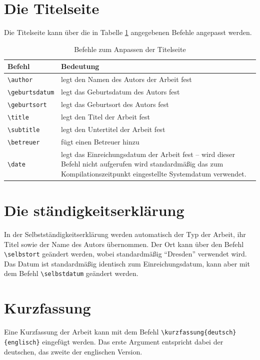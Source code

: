 \section{Die Titelseite}
Die Titelseite kann über die in Tabelle \ref{tab:titel} angegebenen Befehle angepasst werden.
\begin{table}[htbp]
\caption{Befehle zum Anpassen der Titelseite}
\label{tab:titel}
\begin{tabular}{lp{12cm}}
Befehl & Bedeutung\\
\toprule
\verb|\author| & legt den Namen des Autors der Arbeit fest\\
\verb|\geburtsdatum| & legt das Geburtsdatum des Autors fest\\
\verb|\geburtsort| & legt das Geburtsort des Autors fest\\
\verb|\title| & legt den Titel der Arbeit fest\\
\verb|\subtitle| & legt den Untertitel der Arbeit fest\\
\verb|\betreuer| & fügt einen Betreuer hinzu\\
\verb|\date| & legt das Einreichungsdatum der Arbeit fest -- \newline wird dieser Befehl nicht aufgerufen wird standardmäßig das zum Kompilationszeitpunkt eingestellte Systemdatum verwendet.\\
\bottomrule
\end{tabular}
\end{table}



\section{Die ständigkeitserklärung}
In der Selbstständigkeitserklärung werden automatisch der Typ der Arbeit, ihr Titel sowie der Name des Autors übernommen. Der Ort kann über den Befehl \verb|\selbstort| geändert werden, wobei standardmäßig "`Dresden"' verwendet wird. Das Datum ist standardmäßig identisch zum Einreichungsdatum, kann aber mit dem Befehl \verb|\selbstdatum| geändert werden.



\section{Kurzfassung}
Eine Kurzfassung der Arbeit kann mit dem Befehl \verb|\kurzfassung{deutsch}{englisch}| eingefügt werden. Das erste Argument entspricht dabei der deutschen, das zweite der englischen Version.



